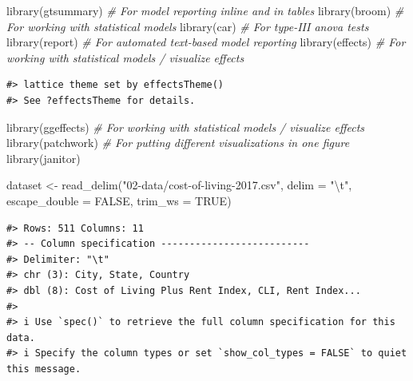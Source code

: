 \documentclass[
  11pt,
  a4paper,
  twoside]{scrbook}
\newenvironment{Shaded}{\begin{snugshade}}{\end{snugshade}}
\newcommand{\AttributeTok}[1]{\textcolor[rgb]{0.77,0.63,0.00}{#1}}
\newcommand{\CommentTok}[1]{\textcolor[rgb]{0.56,0.35,0.01}{\textit{#1}}}
\newcommand{\ConstantTok}[1]{\textcolor[rgb]{0.00,0.00,0.00}{#1}}
\newcommand{\FunctionTok}[1]{\textcolor[rgb]{0.00,0.00,0.00}{#1}}
\newcommand{\NormalTok}[1]{#1}
\newcommand{\OtherTok}[1]{\textcolor[rgb]{0.56,0.35,0.01}{#1}}
\newcommand{\SpecialCharTok}[1]{\textcolor[rgb]{0.00,0.00,0.00}{#1}}
\newcommand{\StringTok}[1]{\textcolor[rgb]{0.31,0.60,0.02}{#1}}
\begin{document}
\linespread{1}

\begin{Shaded}
\begin{Highlighting}[]
\FunctionTok{library}\NormalTok{(gtsummary) }\CommentTok{\# For model reporting inline and in tables}
\FunctionTok{library}\NormalTok{(broom) }\CommentTok{\# For working with statistical models}
\FunctionTok{library}\NormalTok{(car) }\CommentTok{\# For type{-}III anova tests}
\FunctionTok{library}\NormalTok{(report) }\CommentTok{\# For automated text{-}based model reporting}
\FunctionTok{library}\NormalTok{(effects) }\CommentTok{\# For working with statistical models / visualize effects}
\end{Highlighting}
\end{Shaded}

\linespread{1}

\begin{verbatim}
#> lattice theme set by effectsTheme()
#> See ?effectsTheme for details.
\end{verbatim}

\linespread{1}

\begin{Shaded}
\begin{Highlighting}[]
\FunctionTok{library}\NormalTok{(ggeffects) }\CommentTok{\# For working with statistical models / visualize effects}
\FunctionTok{library}\NormalTok{(patchwork) }\CommentTok{\# For putting different visualizations in one figure}
\FunctionTok{library}\NormalTok{(janitor)}

\NormalTok{dataset }\OtherTok{\textless{}{-}} \FunctionTok{read\_delim}\NormalTok{(}\StringTok{"02{-}data/cost{-}of{-}living{-}2017.csv"}\NormalTok{, }
                      \AttributeTok{delim =} \StringTok{"}\SpecialCharTok{\textbackslash{}t}\StringTok{"}\NormalTok{, }\AttributeTok{escape\_double =} \ConstantTok{FALSE}\NormalTok{, }
                      \AttributeTok{trim\_ws =} \ConstantTok{TRUE}\NormalTok{)}
\end{Highlighting}
\end{Shaded}

\linespread{1}

\begin{verbatim}
#> Rows: 511 Columns: 11
#> -- Column specification --------------------------
#> Delimiter: "\t"
#> chr (3): City, State, Country
#> dbl (8): Cost of Living Plus Rent Index, CLI, Rent Index...
#> 
#> i Use `spec()` to retrieve the full column specification for this data.
#> i Specify the column types or set `show_col_types = FALSE` to quiet this message.
\end{verbatim}
\end{document}
